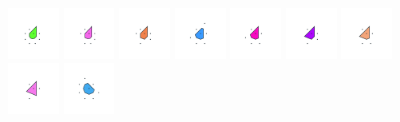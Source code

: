 \documentclass[text.tex]{subfiles}
\begin{document}
\begin{figure}[h!]
\includegraphics[width=0.12\textwidth]{img/results/octagon/octagon_224264_(-5_3alpha_1)_005.pdf}
\includegraphics[width=0.12\textwidth]{img/results/octagon/octagon_224264_(-5_3alpha_1)_006.pdf}
\includegraphics[width=0.12\textwidth]{img/results/octagon/octagon_224264_(-5_3alpha_1)_007.pdf}
\includegraphics[width=0.12\textwidth]{img/results/octagon/octagon_224264_(-5_3alpha_1)_008.pdf}
\includegraphics[width=0.12\textwidth]{img/results/octagon/octagon_224264_(-5_3alpha_1)_009.pdf}
\includegraphics[width=0.12\textwidth]{img/results/octagon/octagon_224264_(-5_3alpha_1)_010.pdf}
\includegraphics[width=0.12\textwidth]{img/results/octagon/octagon_224264_(-5_3alpha_1)_011.pdf}
\includegraphics[width=0.12\textwidth]{img/results/octagon/octagon_224264_(-5_3alpha_1)_012.pdf}
\includegraphics[width=0.12\textwidth]{img/results/octagon/octagon_224264_(-5_3alpha_1)_013.pdf}

\end{figure}
\end{document}

